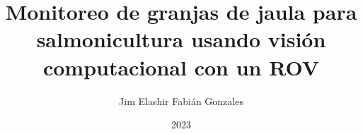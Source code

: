 \documentclass[a4paper,12pt,oneside]{tesisutec}
\begin{document}
\frontmatter

\department{}

\title{Monitoreo de granjas de jaula para salmonicultura usando visión computacional con un ROV}

\author{Jim Elashir Fabián Gonzales } %

\date{2023}

\maketitle



% 
% 

\tableofcontents

\newpage


\newpage



\mainmatter
\pagestyle{fancy}

% 
%  

% 
% 
% 
% 
% 

\renewcommand{\bibname}{\hfill\Large\bf{REFERENCIAS BIBLIOGRÁFICAS}\hfill}



% 
\end{document}

